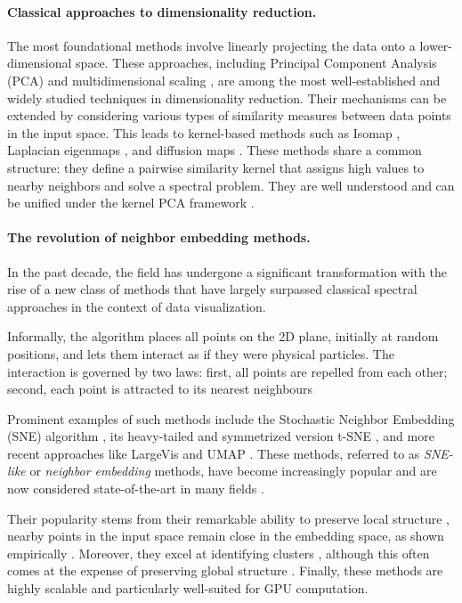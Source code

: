 \paragraph{Classical approaches to dimensionality reduction.}
The most foundational methods involve linearly projecting the data onto a lower-dimensional space. These approaches, including Principal Component Analysis (PCA) \citep{pearson1901liii} and multidimensional scaling \citep{kruskal1978multidimensional}, are among the most well-established and widely studied techniques in dimensionality reduction. Their mechanisms can be extended by considering various types of similarity measures between data points in the input space. This leads to kernel-based methods such as Isomap \citep{balasubramanian2002isomap}, Laplacian eigenmaps \citep{belkin2003laplacian}, and diffusion maps \citep{coifman2006diffusion}. These methods share a common structure: they define a pairwise similarity kernel that assigns high values to nearby neighbors and solve a spectral problem. They are well understood and can be unified under the kernel PCA framework \citep{ham2004kernel}.

\paragraph{The revolution of neighbor embedding methods.}
In the past decade, the field has undergone a significant transformation with the rise of a new class of methods that have largely surpassed classical spectral approaches in the context of data visualization. 

Informally, the algorithm places all
points on the 2D plane, initially at random positions, and lets them
interact as if they were physical particles. The interaction is governed by two laws: first, all points are repelled from each other;
second, each point is attracted to its nearest neighbours

Prominent examples of such methods include the Stochastic Neighbor Embedding (SNE) algorithm \citep{NIPS2002SNE}, its heavy-tailed and symmetrized version t-SNE \citep{maaten2008tSNE}, and more recent approaches like LargeVis \citep{tang2016visualizing} and UMAP \citep{mcinnes2018umap}. These methods, referred to as \textit{SNE-like} or \textit{neighbor embedding} methods, have become increasingly popular and are now considered state-of-the-art in many fields \citep{li2017application,kobak2019art,anders2018dissecting}.
 
Their popularity stems from their remarkable ability to preserve local structure \ie, nearby points in the input space remain close in the embedding space, as shown empirically \citep{wang2021understanding}. Moreover, they excel at identifying clusters \citep{arora2018analysis, linderman2019clustering}, although this often comes at the expense of preserving global structure \citep{wattenberg2016use, coenen2019understanding}. Finally, these methods are highly scalable and particularly well-suited for GPU computation.


